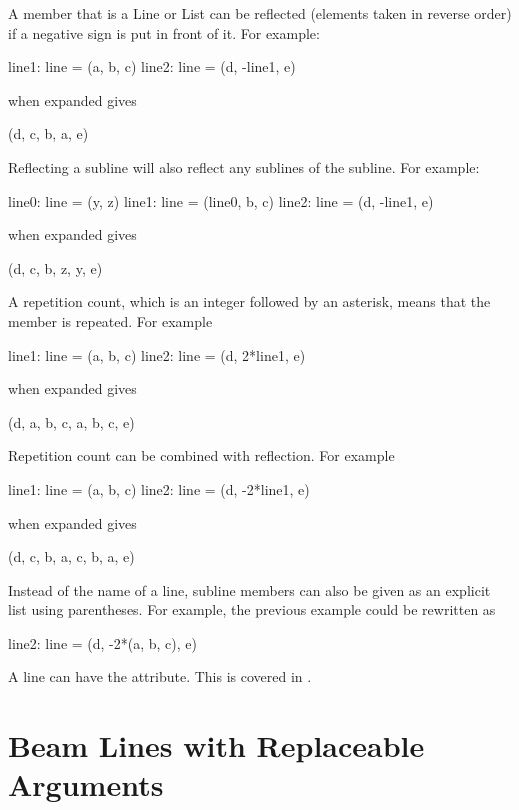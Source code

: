 A member that is a Line or List can be reflected 
(elements taken in reverse order) if
a negative sign is put in front of it. For example:
\begin{example}
  line1: line = (a, b, c)
  line2: line = (d, -line1, e)
\end{example}
 when expanded gives
\begin{example}
  (d, c, b, a, e)
\end{example}
Reflecting a subline will also reflect any sublines of the subline. For
example:
\begin{example}
  line0: line = (y, z)
  line1: line = (line0, b, c)
  line2: line = (d, -line1, e)
\end{example}
 when expanded gives
\begin{example}
  (d, c, b, z, y, e)
\end{example}

A repetition count, which is an integer followed by an asterisk, 
means that the member is
repeated. For example
\begin{example}
  line1: line = (a, b, c)
  line2: line = (d, 2*line1, e)
\end{example}
 when expanded gives
\begin{example}
  (d, a, b, c, a, b, c, e)
\end{example}
Repetition count can be combined with reflection. For example
\begin{example}
  line1: line = (a, b, c)
  line2: line = (d, -2*line1, e)
\end{example}
 when expanded gives
\begin{example}
  (d, c, b, a, c, b, a, e)
\end{example}
Instead of the name of a line, subline members can also be given as an explicit 
list using parentheses. For example, the previous example could be rewritten as
\begin{example}
  line2: line = (d, -2*(a, b, c), e)
\end{example}

A line can have the  attribute. This is covered in
.

\section{Beam Lines with Replaceable Arguments}

